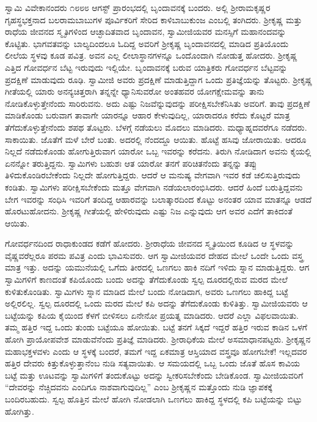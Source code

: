  ಸ್ವಾಮಿ ವಿವೇಕಾನಂದರು ೧೮೮೮ ಆಗಸ್ಟ್ ಪ್ರಾರಂಭದಲ್ಲಿ ಬೃಂದಾವನಕ್ಕೆ ಬಂದರು. ಅಲ್ಲಿ ಶ‍್ರೀರಾಮಕೃಷ್ಣರ ಗೃಹಸ್ಥಭಕ್ತನಾದ ಬಲರಾಮಬಾಬುಗಳ ಪೂರ್ವಿಕರಿಗೆ ಸೇರಿದ ಕಾಳಿಬಾಬುಕುಂಜ ಎಂಬಲ್ಲಿ ತಂಗಿದರು. ಶ‍್ರೀಕೃಷ್ಣ ಮತ್ತು ರಾಧೆಯ ಜೀವನದ ಸ್ಮೃತಿಗಳಿಂದ ಆಚ್ಛಾದಿತವಾದ ಬೃಂದಾವನ, ಸ್ವಾಮೀಜಿಯವರ ಮನಸ್ಸಿಗೆ ಮಹಾನಂದವನ್ನು ಕೊಟ್ಟಿತು. ಭಾಗವತವನ್ನು ಬಾಲ್ಯದಿಂದಲೂ ಓದಿದ್ದ ಅವರಿಗೆ ಶ‍್ರೀಕೃಷ್ಣ ಬೃಂದಾವನದಲ್ಲಿ ಮಾಡಿದ ಪ್ರತಿಯೊಂದು ಲೀಲೆಯ ಸ್ಥಳವು ಕೂಡ ಪವಿತ್ರ. ಅವನ ಎಲ್ಲ ಲೀಲಾಸ್ಥಾನಗಳನ್ನೂ ಒಂದೊಂದಾಗಿ ನೋಡುತ್ತ ಹೋದರು. ಶ‍್ರೀಕೃಷ್ಣ ಎತ್ತಿದ ಗೋವರ್ಧನ ಬೆಟ್ಟ ಇರುವುದು ಇಲ್ಲಿಯೇ. ಬೃಂದಾವನಕ್ಕೆ ಬರುವ ಯಾತ್ರಿಕರು ಗೋವರ್ಧನ ಬೆಟ್ಟವನ್ನು ಪ್ರದಕ್ಷಿಣೆ ಮಾಡುವುದು ರೂಢಿ. ಸ್ವಾಮೀಜಿ ಅವರು ಪ್ರದಕ್ಷಿಣೆ ಮಾಡುತ್ತಿದ್ದಾಗ ಒಂದು ಪ್ರತಿಜ್ಞೆಯನ್ನು ತೊಟ್ಟರು. ಶ‍್ರೀಕೃಷ್ಣ ಗೀತೆಯಲ್ಲಿ ಯಾರು ಅನನ್ಯಚಿತ್ತರಾಗಿ ತನ್ನನ್ನೇ ಧ್ಯಾನಿಸುವರೋ ಅಂತಹವರ ಯೋಗಕ್ಷೇಮವನ್ನು ತಾನು ನೋಡಿಕೊಳ್ಳುತ್ತೇನೆಂದು ಸಾರಿರುವನು. ಅದು ಎಷ್ಟು ನಿಜವೆನ್ನುವುದನ್ನು ಪರೀಕ್ಷಿಸಬೇಕೆನಿಸಿತು ಅವರಿಗೆ. ತಾವು ಪ್ರದಕ್ಷಿಣೆ ಮಾಡಿಕೊಂಡು ಬರುವಾಗ ತಾವಾಗೇ ಯಾರನ್ನೂ ಆಹಾರ ಕೇಳುವುದಿಲ್ಲ, ಯಾರಾದರೂ ಕರೆದು ಕೊಟ್ಟರೆ ಮಾತ್ರ ತೆಗೆದುಕೊಳ್ಳುತ್ತೇನೆಂದು ಶಪಥ ತೊಟ್ಟರು. ಬೆಳಗ್ಗೆ ನಡೆಯಲು ಮೊದಲು ಮಾಡಿದರು. ಮಧ್ಯಾಹ್ನದವರೆಗೂ ನಡೆದರು. ಸಾಕಾಯಿತು. ಜೊತೆಗೆ ಮಳೆ ಬೇರೆ ಬಂತು. ಅದರಲ್ಲಿ ನೆಂದದ್ದೂ ಆಯಿತು. ಹೊಟ್ಟೆ ಹಸಿವು ಜೋರಾಯಿತು. ಆದರೂ ನಿಲ್ಲದೆ ನಡೆದುಕೊಂಡು ಹೋಗುತ್ತಿರುವಾಗ ಯಾರೋ ಒಬ್ಬ ಇವರನ್ನು ಕರೆದನು. ತಿರುಗಿ ನೋಡಿದಾಗ ಅವನು ಕೈಯಲ್ಲಿ ಏನನ್ನೋ ತರುತ್ತಿದ್ದನು. ಸ್ವಾಮಿಗಳು ಬಹುಶಃ ಆತ ಯಾರೋ ತನಗೆ ಪರಿಚಿತನೆಂದು ತನ್ನನ್ನು ತಪ್ಪು ತಿಳಿದುಕೊಂಡಿರಬೇಕೆಂದು ನಿಲ್ಲದೇ ಹೋಗುತ್ತಿದ್ದರು. ಆದರೆ ಆ ಮನುಷ್ಯ ವೇಗವಾಗಿ ಇವರ ಕಡೆ ಚಲಿಸುತ್ತಿರುವುದು ಕಂಡಿತು. ಸ್ವಾಮಿಗಳು ಪರೀಕ್ಷಿಸಬೇಕೆಂದು ಮತ್ತೂ ವೇಗವಾಗಿ ನಡೆಯಲಾರಂಭಿಸಿದರು. ಆದರೆ ಹಿಂದೆ ಬರುತ್ತಿದ್ದವನು ಬೇಗ ಇವರನ್ನು ಸಂಧಿಸಿ ಇವರಿಗೆ ತಂದಿದ್ದ ಆಹಾರವನ್ನು ಬಲಾತ್ಕಾರದಿಂದ ಕೊಟ್ಟು ಅನಂತರ ಯಾವ ಮಾತನ್ನೂ ಆಡದೆ ಹೊರಟುಹೋದನು. ಶ‍್ರೀಕೃಷ್ಣ ಗೀತೆಯಲ್ಲಿ ಹೇಳಿರುವುದು ಎಷ್ಟು ನಿಜ ಎನ್ನುವುದು ಆಗ ಅವರ ಎದೆಗೆ ತಾಕಿದಂತೆ ಆಯಿತು. 

 ಗೋವರ್ಧನದಿಂದ ರಾಧಾಕುಂಡದ ಕಡೆಗೆ ಹೋದರು. ಶ‍್ರೀರಾಧೆಯ ಜೀವನದ ಸ್ಮೃತಿಯಿಂದ ಕೂಡಿದ ಆ ಸ್ಥಳವನ್ನು ವೈಷ್ಣವರೆಲ್ಲರೂ ಪರಮ ಪವಿತ್ರ ಎಂದು ಭಾವಿಸುವರು. ಆಗ ಸ್ವಾಮೀಜಿಯವರ ದೇಹದ ಮೇಲೆ ಒಂದೇ ಒಂದು ವಸ್ತ್ರ ಮಾತ್ರ ಇತ್ತು. ಅದನ್ನು ಯಮುನೆಯಲ್ಲಿ ಒಗೆದು ತೀರದಲ್ಲಿ ಒಣಗಲು ಹಾಕಿ ನದಿಗೆ ಇಳಿದು ಸ್ನಾನ ಮಾಡುತ್ತಿದ್ದರು. ಆಗ ಸ್ವಾಮಿಗಳಿಗೆ ಕಾಣದಂತೆ ಕಪಿಯೊಂದು ಬಂದು ಅದನ್ನು ತೆಗೆದುಕೊಂಡು ಸ್ವಲ್ಪ ದೂರದಲ್ಲಿರುವ ಮರದ ಮೇಲೆ ಕುಳಿತುಕೊಂಡಿತು. ಸ್ವಾಮಿಗಳು ಸ್ನಾನ ಮಾಡಿದ ಮೇಲೆ ಬಂದು ನೋಡಿದಾಗ, ಅವರು ಒಣಗಲು ಹಾಕಿದ್ದ ಬಟ್ಟೆ ಅಲ್ಲಿರಲಿಲ್ಲ. ಸ್ವಲ್ಪ ದೂರದಲ್ಲಿ ಒಂದು ಮರದ ಮೇಲೆ ಕಪಿ ಅದನ್ನು ತೆಗೆದುಕೊಂಡು ಕುಳಿತಿತ್ತು. ಸ್ವಾಮೀಜಿಯವರು ಆ ಬಟ್ಟೆಯನ್ನು ಕಪಿಯ ಕೈಯಿಂದ ಕೆಳಗೆ ಬೀಳಿಸಲು ಏನೇನೋ ಪ್ರಯತ್ನ ಮಾಡಿದರು. ಆದರೆ ಎಲ್ಲಾ ವಿಫಲವಾಯಿತು. ತಮ್ಮ ಹತ್ತಿರ ಇದ್ದ ಒಂದು ತುಂಡು ಬಟ್ಟೆಯೂ ಹೋಯಿತು. ಬಟ್ಟೆ ತನಗೆ ಸಿಕ್ಕದೆ ಇದ್ದರೆ ಹತ್ತಿರ ಇರುವ ಕಾಡಿನ ಒಳಗೆ ಹೋಗಿ ಪ್ರಾಯೋಪವೇಶ ಮಾಡುವೆನೆಂದು ಪ್ರತಿಜ್ಞೆ ಮಾಡಿದರು. ಶ‍್ರೀರಾಧಿಕೆಯ ಮೇಲೆ ಅಸಮಾಧಾನಪಟ್ಟರು. ಶ‍್ರೀಕೃಷ್ಣನ ಮಹಾಭಕ್ತಳವಳು ಎಂದು ಆ ಸ್ಥಳಕ್ಕೆ ಬಂದರೆ, ತಮಗೆ ಇದ್ದ ಏಕಮಾತ್ರ ಆಸ್ತಿಯಾದ ವಸ್ತ್ರವೂ ಹೋಗಬೇಕೆ! ಇಲ್ಲದವರ ಹತ್ತಿರ ದೇವರು ಕಿತ್ತುಕೊಳ್ಳುತ್ತಾನೆಂಬ ನುಡಿ ಸತ್ಯವಾಯಿತು. ಆ ಸಮಯದಲ್ಲಿ ಒಬ್ಬ ಒಂದು ಜೊತೆ ಹೊಸ ಕಾವಿಯ ಬಟ್ಟೆ ಮತ್ತು ಊಟವನ್ನು ಸ್ವಾಮಿಗಳಿಗೆ ತಂದುಕೊಟ್ಟು ಅದನ್ನು ಸ್ವೀಕರಿಸಬೇಕೆಂದು ಬೇಡಿಕೊಂಡ. ಸ್ವಾಮೀಜಿಯವರಿಗೆ “ದೇವರನ್ನು ನೆಚ್ಚಿದವನು ಎಂದಿಗೂ ನಾಶವಾಗುವುದಿಲ್ಲ” ಎಂಬ ಶ‍್ರೀಕೃಷ್ಣನ ಮತ್ತೊಂದು ನುಡಿ ಜ್ಞಾಪಕಕ್ಕೆ ಬಂದಿರಬಹುದು. ಸ್ವಲ್ಪ ಹೊತ್ತಿನ ಮೇಲೆ ಹೋಗಿ ನೋಡಲಾಗಿ ಒಣಗಲು ಹಾಕಿದ್ದ ಸ್ಥಳದಲ್ಲಿ ಕಪಿ ಬಟ್ಟೆಯನ್ನು ಬಿಟ್ಟು ಹೋಗಿತ್ತು. 

